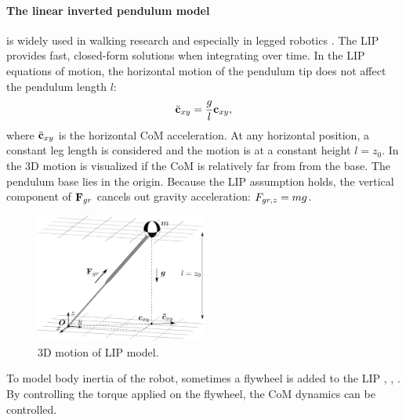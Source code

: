 \paragraph{The linear inverted pendulum model} is widely used in walking research and especially in legged robotics \cite{kajita20013d}. The \ac{LIP} provides fast, closed-form solutions when integrating over time. In the \ac{LIP} equations of motion, the horizontal motion of the pendulum tip does not affect the pendulum length $l$:
\begin{equation}
\ddot{\mathbf{c}}_{xy}=\frac{g}{l}\mathbf{c}_{xy},
\label{eq:LIPeom}
\end{equation}
where $\ddot{\mathbf{c}}_{xy}$ is the horizontal \ac{CoM} acceleration. At any horizontal position, a constant leg length is considered and the motion is at a constant height $l=z_0$. In  the \ac{3D} motion is visualized if the \ac{CoM} is relatively far from from the base. The pendulum base lies in the origin. Because the \ac{LIP} assumption holds, the vertical component of $\mathbf{F}_{gr}$ cancels out gravity acceleration: $F_{gr,z}=mg$.\\
\begin{figure}
\centering
\includegraphics[width=0.5\textwidth]{STYLESTUFF/3DCoMwithoutfoot.png}
\caption{\ac{3D} motion of \ac{LIP} model.}
\label{fig:3dlip}
\end{figure}

To model body inertia of the robot, sometimes a flywheel is added to the \ac{LIP} \cite{pratt2006capture}, \cite{stephens2007humanoid}, \cite{koolen2012capturability}. By controlling the torque applied on the flywheel, the \ac{CoM} dynamics can be controlled.

